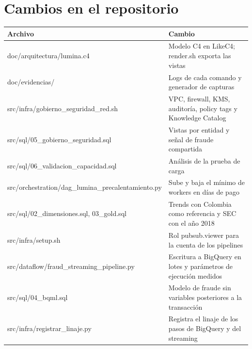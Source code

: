 \documentclass[11pt,a4paper]{article}
\DeclareRobustCommand{\cod}[1]{{\small\ttfamily\codbreaks #1}}
\DeclareRobustCommand{\codbreaks}{\let\oldus\_\renewcommand{\_}{\oldus\allowbreak}}
\begin{document}
\clearpage
\appendix
\section{Cambios en el repositorio}

\begingroup\small
\begin{xltabular}{\linewidth}{@{}P{6.2cm}L@{}}
\toprule
\textbf{Archivo} & \textbf{Cambio}\\
\midrule\endhead
\cod{doc/arquitectura/lumina.c4} & Modelo C4 en LikeC4; \cod{render.sh} exporta las vistas\\
\cod{doc/evidencias/} & Logs de cada comando y generador de capturas\\
\cod{src/infra/\allowbreak gobierno\_seguridad\_red.sh} & VPC, firewall, KMS, auditoría, policy tags y Knowledge Catalog\\
\cod{src/sql/05\_gobierno\_seguridad.sql} & Vistas por entidad y señal de fraude compartida\\
\cod{src/sql/06\_validacion\_capacidad.sql} & Análisis de la prueba de carga\\
\cod{src/orchestration/\allowbreak dag\_lumina\_precalentamiento.py} & Sube y baja el mínimo de workers en días de pago\\
\cod{src/sql/02\_dimensiones.sql}, \cod{03\_gold.sql} & Trends con Colombia como referencia y SEC con el año 2018\\
\cod{src/infra/setup.sh} & Rol \cod{pubsub.viewer} para la cuenta de los pipelines\\
\cod{src/dataflow/\allowbreak fraud\_streaming\_pipeline.py} & Escritura a BigQuery en lotes y parámetros de ejecución medidos\\
\cod{src/sql/04\_bqml.sql} & Modelo de fraude sin variables posteriores a la transacción\\
\cod{src/infra/registrar\_linaje.py} & Registra el linaje de los pasos de BigQuery y del streaming\\
\bottomrule
\end{xltabular}
\endgroup
\end{document}
